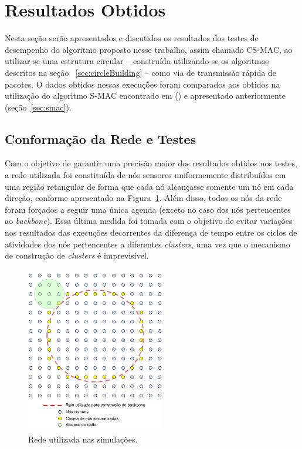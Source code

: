 \section{Resultados Obtidos}

Nesta seção serão apresentados e discutidos os resultados dos testes de desempenho do algoritmo proposto nesse trabalho, assim chamado CS-MAC, ao utilizar-se uma estrutura circular -- construída utilizando-se os algoritmos descritos na seção ~\ref{sec:circleBuilding} -- como via de transmissão rápida de pacotes. O dados obtidos nessas execuções foram comparados aos obtidos na utilização do algoritmo S-MAC encontrado em  (\citeyear{ye04}) e apresentado anteriormente (seção~\ref{sec:smac}).

\subsection{Conformação da Rede e Testes}

Com o objetivo de garantir uma precisão maior dos resultados obtidos nos testes, a rede utilizada foi constituída de nós sensores uniformemente distribuídos em uma região retangular de forma que cada nó alcançasse somente um nó em cada direção, conforme apresentado na Figura~\ref{fig:simulationNetwork}. Além disso, todos os nós da rede foram forçados a seguir uma única agenda (exceto no caso dos nós pertencentes ao \emph{backbone}). Essa última medida foi tomada com o objetivo de evitar variações nos resultados das execuções decorrentes da diferença de tempo entre os ciclos de atividades dos nós pertencentes a diferentes \emph{clusters}, uma vez que o mecanismo de construção de \emph{clusters} é imprevisível.

\begin{figure}[!htb]
\centering
\includegraphics[width=230px,height=275px]{./Pictures/SimulationNetwork.png}
\caption{Rede utilizada nas simulações.} %
\label{fig:simulationNetwork} %
\end{figure}

